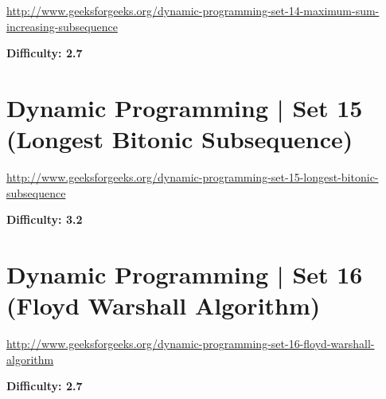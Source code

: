 \url{http://www.geeksforgeeks.org/dynamic-programming-set-14-maximum-sum-increasing-subsequence}

\textbf{Difficulty: 2.7}

\textbf{}

\RayNotesBegin



\RayNotesEnd

\textbf{}



\section{Dynamic Programming | Set 15 (Longest Bitonic Subsequence)
  \label{secGFGDPSet15LongstBitonicSubseq}}

\url{http://www.geeksforgeeks.org/dynamic-programming-set-15-longest-bitonic-subsequence}

\textbf{Difficulty: 3.2}

\textbf{}

\RayNotesBegin



\RayNotesEnd

\textbf{}



\section{Dynamic Programming | Set 16 (Floyd Warshall Algorithm)
  \label{secGFGDPSet16FloydWarshallAlgo}}

\url{http://www.geeksforgeeks.org/dynamic-programming-set-16-floyd-warshall-algorithm}

\textbf{Difficulty: 2.7}


\textbf{}


